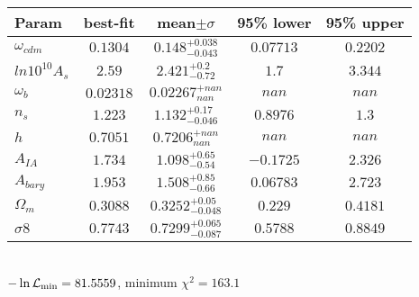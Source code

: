 \begin{tabular}{|l|c|c|c|c|} 
 \hline 
Param & best-fit & mean$\pm\sigma$ & 95\% lower & 95\% upper \\ \hline 
$\omega_{cdm }$ &$0.1304$ & $0.148_{-0.043}^{+0.038}$ & $0.07713$ & $0.2202$ \\ 
$ln10^{10}A_{s }$ &$2.59$ & $2.421_{-0.72}^{+0.2}$ & $1.7$ & $3.344$ \\ 
$\omega_{b }$ &$0.02318$ & $0.02267_{nan}^{+nan}$ & $nan$ & $nan$ \\ 
$n_{s }$ &$1.223$ & $1.132_{-0.046}^{+0.17}$ & $0.8976$ & $1.3$ \\ 
$h$ &$0.7051$ & $0.7206_{nan}^{+nan}$ & $nan$ & $nan$ \\ 
$A_{IA }$ &$1.734$ & $1.098_{-0.54}^{+0.65}$ & $-0.1725$ & $2.326$ \\ 
$A_{bary }$ &$1.953$ & $1.508_{-0.66}^{+0.85}$ & $0.06783$ & $2.723$ \\ 
$\Omega_{m }$ &$0.3088$ & $0.3252_{-0.048}^{+0.05}$ & $0.229$ & $0.4181$ \\ 
$\sigma8$ &$0.7743$ & $0.7299_{-0.087}^{+0.065}$ & $0.5788$ & $0.8849$ \\ 
\hline 
 \end{tabular} \\ 
$-\ln{\cal L}_\mathrm{min} =81.5559$, minimum $\chi^2=163.1$ \\ 
